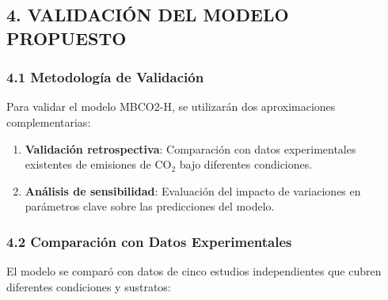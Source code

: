 \documentclass[
]{article}
\begin{document}
\subsection{4. VALIDACIÓN DEL MODELO
PROPUESTO}\label{validaciuxf3n-del-modelo-propuesto}

\subsubsection{4.1 Metodología de
Validación}\label{metodologuxeda-de-validaciuxf3n}

Para validar el modelo MBCO2-H, se utilizarán dos aproximaciones
complementarias:

\begin{enumerate}
\def\labelenumi{\arabic{enumi}.}
\item
  \textbf{Validación retrospectiva}: Comparación con datos
  experimentales existentes de emisiones de CO$_2$ bajo diferentes
  condiciones.
\item
  \textbf{Análisis de sensibilidad}: Evaluación del impacto de
  variaciones en parámetros clave sobre las predicciones del modelo.
\end{enumerate}

\subsubsection{4.2 Comparación con Datos
Experimentales}\label{comparaciuxf3n-con-datos-experimentales}

El modelo se comparó con datos de cinco estudios independientes que
cubren diferentes condiciones y sustratos:
\end{document}
